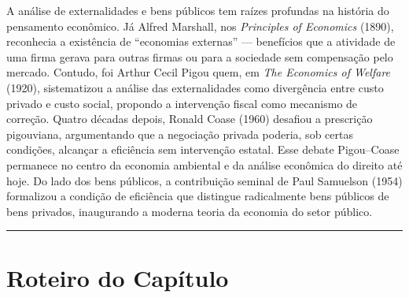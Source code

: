 \documentclass[11pt,twoside,openright]{book}
\begin{document}
A análise de externalidades e bens públicos tem raízes profundas na
história do pensamento econômico. Já Alfred Marshall, nos
\emph{Principles of Economics} (1890), reconhecia a existência de
``economias externas'' --- benefícios que a atividade de uma firma
gerava para outras firmas ou para a sociedade sem compensação pelo
mercado. Contudo, foi Arthur Cecil Pigou quem, em \emph{The Economics of
Welfare} (1920), sistematizou a análise das externalidades como
divergência entre custo privado e custo social, propondo a intervenção
fiscal como mecanismo de correção. Quatro décadas depois, Ronald Coase
(1960) desafiou a prescrição pigouviana, argumentando que a negociação
privada poderia, sob certas condições, alcançar a eficiência sem
intervenção estatal. Esse debate Pigou--Coase permanece no centro da
economia ambiental e da análise econômica do direito até hoje. Do lado
dos bens públicos, a contribuição seminal de Paul Samuelson (1954)
formalizou a condição de eficiência que distingue radicalmente bens
públicos de bens privados, inaugurando a moderna teoria da economia do
setor público.

\begin{center}\rule{0.5\linewidth}{0.5pt}\end{center}

\section{Roteiro do Capítulo}\label{roteiro-do-capuxedtulo-1}
\end{document}
